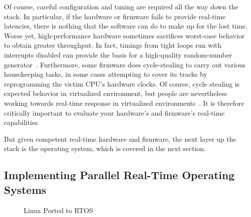 Of course, careful configuration and tuning are required all the way down
the stack.
In particular, if the hardware or firmware fails to provide real-time
latencies, there is nothing that the software can do to make up for the
lost time.
Worse yet, high-performance hardware sometimes sacrifices worst-case behavior
to obtain greater throughput.
In fact, timings from tight loops run with interrupts disabled can
provide the basis for a high-quality random-number
generator~\cite{PeterOkech2009InherentRandomness}.
Furthermore, some firmware does cycle-stealing to carry out various
housekeeping tasks, in some cases attempting to cover its tracks by
reprogramming the victim CPU's hardware clocks.
Of course, cycle stealing is expected behavior in virtualized
environment, but people are nevertheless working towards real-time
response in virtualized
environments~\cite{ThomasGleixner2012KVMrealtime,JanKiszka2014virtRT}.
It is therefore critically important to evaluate your hardware's and
firmware's real-time capabilities.

But given competent real-time hardware and firmware, the next
layer up the stack is the operating system, which is covered in
the next section.

\subsection{Implementing Parallel Real-Time Operating Systems}
\label{sec:advsync:Implementing Parallel Real-Time Operating Systems}

\begin{figure}[tb]
\centering
{}
\caption{Linux Ported to RTOS}
\label{fig:advsync:Linux Ported to RTOS}
\end{figure}

